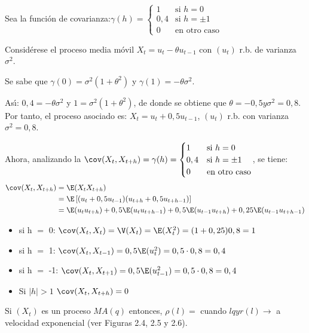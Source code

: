\begin{ejemplo}
 Sea la funci\'{o}n de covarianza:$\gamma (h)=\begin{cases}
     1& \text{si }h=0\\
     0,4& \text{si }h=\pm 1\\
     0 &\text{en otro caso}
    \end{cases}$

Consid\'{e}rese el proceso media m\'{o}vil $X_{{t}} =u_{{t}}-\theta u_{t-1} $ con $(u_{t} )$ r.b. de varianza $\sigma^{2}$.

Se sabe que $\gamma (0)=\sigma^{2}(1+\theta^{2})$ y $\gamma (1)=-\theta 
 \sigma^{2}$.

As\'{\i}: $0,4=-\theta \sigma^{2}$ y  $1= \sigma^{2}(1+\theta^{2})$, de 
donde se obtiene que $\theta =-0,5y\sigma^{2}=0,8$. Por tanto, el 
proceso asociado es: $X_{t} =u_{t} +0,5u_{t-1}$, $(u_{t})$  r.b. con varianza $\sigma^{2}=0,8$.

Ahora, analizando la $\cov(X_{t} ,X_{t+h} )=\gamma (h)=\begin{cases}
     1& \text{si }h=0\\
     0,4& \text{si }h=\pm 1\\
     0 &\text{en otro caso}
    \end{cases}$, se tiene:
\begin{align*}
 \cov(X_{t} ,X_{t+h} )&=\E(X_{t} X_{t+h} )\\
	 &=\E\left[ {(u_{t} +0,5u_{t-1} )(u_{t+h} +0,5u_{t+h-1} )} \right]\\
	 &=\E(u_{t} u_{t+h} )+0,5\E(u_{t} u_{t+h-1} )+0,5\E(u_{t-1} u_{t+h} )+0,25\E(u_{t-1} u_{t+h-1} )
\end{align*}

\begin{itemize}
\item si h $=$ 0: $\cov(X_{t} ,X_{t})=\V(X_{t} )=\E(X_{t}^{2} )=(1+0,25)0,8=1$
\item si h $=$ 1: $\cov(X_{t} ,X_{t-1} )=0,5\E(u_{t}^{2} )=0,5\cdot 0,8=0,4$
\item si h $=$ -1: $\cov(X_{t} ,X_{t+1} )=0,5\E(u_{t-1}^{2} )=0,5\cdot 0,8=0,4$
\item Si $\left| h \right|>1$ $\cov(X_{t} ,X_{t+h} )=0$
\end{itemize}
\end{ejemplo}

\begin{observacion}
 Si $(X_{t})$ es un proceso $MA(q)$ 
entonces, $\rho (l) = $ cuando $l q {y} r(l) \to $ a velocidad 
exponencial (ver Figuras 2.4, 2.5 y 2.6).
\end{observacion}


